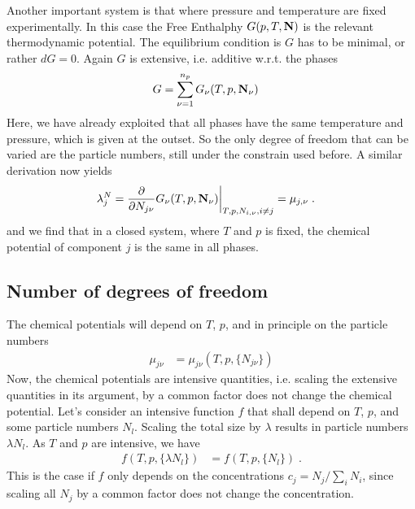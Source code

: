 Another important system is that where pressure and temperature are fixed experimentally.
In this case the  Free Enthalphy $G(p,T,\mathbf N)$ is the relevant thermodynamic potential.
The equilibrium condition is $G$ has to be minimal, or rather $dG=0$. Again $G$ is extensive, i.e.
additive w.r.t. the phases
%
\begin{align}\label{eq:}
G &= \sum_{\nu=1}^{n_{p} } G_{\nu}(T,p,\mathbf N_{\nu})
\end{align}
%
Here, we have already exploited that all phases have the same temperature and pressure, which is given at the outset. So the only degree of freedom that can be varied are the particle numbers, still under the constrain used before. A similar derivation now yields
%
\begin{align}\label{eq:mu:condition}
\lambda^{N}_{j}&=\frac{\partial }{\partial N_{j\nu}} G_{\nu}(T,p,\mathbf N_{\nu})\bigg|_{T,p,N_{i,\nu},i\ne j} = \mu_{j,\nu}\;.
\end{align}
%
and we find that in a closed system, where $T$ and $p$ is fixed, the chemical potential of component
$j$ is the same in all phases.
\subsection{Number of degrees of freedom}
The chemical potentials will depend on $T$, $p$, and in principle on the particle numbers
%
\begin{align}\label{eq:}
\mu_{j\nu} &=\mu_{j\nu}(T,p,\{N_{j\nu}\})
\end{align}
%
Now, the chemical potentials are intensive quantities, i.e. scaling the extensive quantities in its argument, by a common factor does not change the chemical potential. Let's consider an intensive function
$f$ that shall depend on $T$, $p$, and some particle numbers $N_{l}$. Scaling the total size
by $\lambda$ results in particle numbers $\lambda N_{l}$. As $T$ and $p$ are intensive,
we have 
%
\begin{align*}
f(T,p,\{\lambda N_{l}\}) &= f(T,p,\{N_{l}\})\;.
\end{align*}
%
This is the case if $f$ only depends on the concentrations $c_{j}=N_{j}/\sum_{i} N_{i}$, since
scaling all $N_{j}$ by a common factor does not change the concentration.


